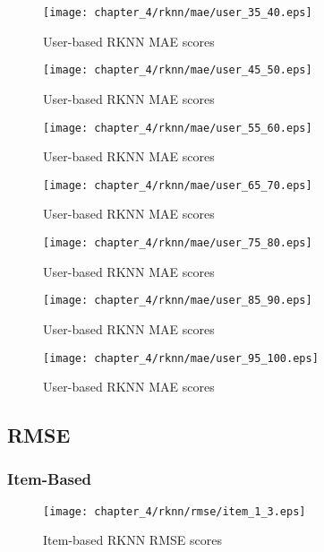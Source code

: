 \begin{figure}[H]
\centering
\texttt{[image: chapter\_4/rknn/mae/user\_35\_40.eps]}
\caption{User-based RKNN MAE scores}
\end{figure}

\begin{figure}[H]
\centering
\texttt{[image: chapter\_4/rknn/mae/user\_45\_50.eps]}
\caption{User-based RKNN MAE scores}
\end{figure}

\begin{figure}[H]
\centering
\texttt{[image: chapter\_4/rknn/mae/user\_55\_60.eps]}
\caption{User-based RKNN MAE scores}
\end{figure}

\begin{figure}[H]
\centering
\texttt{[image: chapter\_4/rknn/mae/user\_65\_70.eps]}
\caption{User-based RKNN MAE scores}
\end{figure}

\begin{figure}[H]
\centering
\texttt{[image: chapter\_4/rknn/mae/user\_75\_80.eps]}
\caption{User-based RKNN MAE scores}
\end{figure}

\begin{figure}[H]
\centering
\texttt{[image: chapter\_4/rknn/mae/user\_85\_90.eps]}
\caption{User-based RKNN MAE scores}
\end{figure}

\begin{figure}[H]
\centering
\texttt{[image: chapter\_4/rknn/mae/user\_95\_100.eps]}
\caption{User-based RKNN MAE scores}
\end{figure}

\subsection{RMSE}

\subsubsection{Item-Based}

\begin{figure}[H]
\centering
\texttt{[image: chapter\_4/rknn/rmse/item\_1\_3.eps]}
\caption{Item-based RKNN RMSE scores}
\end{figure}

